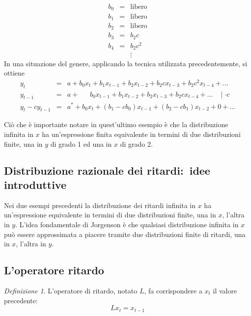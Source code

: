 \documentclass[a4paper]{report}
\newcounter{ese}
\newcounter{def}
\theoremstyle{remark}
\newtheorem{definizione}[def]{Definizione}
\newcounter{theor}
\begin{document}
\begin{eqnarray*}
b_{0} &=&\text{libero} \\
b_{1} &=&\text{libero} \\
b_{2} &=&\text{libero} \\
b_{3} &=&b_{2}c \\
b_{4} &=&b_{2}c^{2} \\
&&\vdots
\end{eqnarray*}%
In una situazione del genere, applicando la tecnica utilizzata
precedentemente, si ottiene%
\begin{eqnarray*}
y_{t}
&=&a+b_{0}x_{t}+b_{1}x_{t-1}+b_{2}x_{t-2}+b_{2}cx_{t-3}+b_{2}c^{2}x_{t-4}+%
\ldots \\
y_{t-1} &=&a+\ \ \ \ \ \ \
b_{0}x_{t-1}+b_{1}x_{t-2}+b_{2}x_{t-3}+b_{2}cx_{t-4}+\ldots \ \ \ \ \mid
\cdot c \\
y_{t}-cy_{t-1} &=&a^{\ast
}+b_{0}x_{t}+(b_{1}-cb_{0})x_{t-1}+(b_{2}-cb_{1})x_{t-2}+0+\ldots
\end{eqnarray*}

\noindent Ci\`{o} che \`{e} importante notare in quest'ultimo esempio \`{e}
che la distribuzione infinita in $x$ ha un'espressione finita equivalente in
termini di due distribuzioni finite, una in $y$ di grado 1 ed una in $x$ di
grado 2.

\subsection{Distribuzione razionale dei ritardi:\ idee introduttive}

\noindent Nei due esempi precedenti la distribuzione dei ritardi infinita in 
$x$ ha un'espressione equivalente in termini di due distribuzioni finite,
una in $x$, l'altra in $y$. L'idea fondamentale di Jorgenson \`{e} che
qualsiasi distribuzione infinita in $x$ pu\`{o} essere approssimata a
piacere tramite due distribuzioni finite di ritardi, una in $x$, l'altra in $%
y$.

\subsection{L'operatore ritardo}

\begin{definizione}
L'operatore di ritardo, notato $L$, fa corrispondere a $x_{t}$ il valore
precedente:%
\begin{equation*}
Lx_{t}=x_{t-1}
\end{equation*}
\end{definizione}
\end{document}
